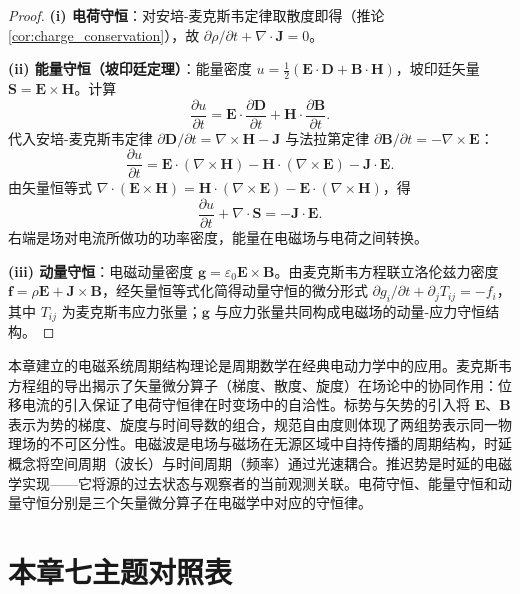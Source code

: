 \begin{proof}
\textbf{(i) 电荷守恒}：对安培-麦克斯韦定律取散度即得（推论 \ref{cor:charge_conservation}），故 $\partial\rho/\partial t + \nabla\cdot\mathbf{J}=0$。

\textbf{(ii) 能量守恒（坡印廷定理）}：能量密度 $u = \frac12(\mathbf{E}\cdot\mathbf{D} + \mathbf{B}\cdot\mathbf{H})$，坡印廷矢量 $\mathbf{S} = \mathbf{E}\times\mathbf{H}$。计算
\[
\frac{\partial u}{\partial t} = \mathbf{E}\cdot\frac{\partial\mathbf{D}}{\partial t} + \mathbf{H}\cdot\frac{\partial\mathbf{B}}{\partial t}.
\]
代入安培-麦克斯韦定律 $\partial\mathbf{D}/\partial t = \nabla\times\mathbf{H} - \mathbf{J}$ 与法拉第定律 $\partial\mathbf{B}/\partial t = -\nabla\times\mathbf{E}$：
\[
\frac{\partial u}{\partial t} = \mathbf{E}\cdot(\nabla\times\mathbf{H}) - \mathbf{H}\cdot(\nabla\times\mathbf{E}) - \mathbf{J}\cdot\mathbf{E}.
\]
由矢量恒等式 $\nabla\cdot(\mathbf{E}\times\mathbf{H}) = \mathbf{H}\cdot(\nabla\times\mathbf{E}) - \mathbf{E}\cdot(\nabla\times\mathbf{H})$，得
\[
\frac{\partial u}{\partial t} + \nabla\cdot\mathbf{S} = -\mathbf{J}\cdot\mathbf{E}.
\]
右端是场对电流所做功的功率密度，能量在电磁场与电荷之间转换。

\textbf{(iii) 动量守恒}：电磁动量密度 $\mathbf{g} = \varepsilon_0\mathbf{E}\times\mathbf{B}$。由麦克斯韦方程联立洛伦兹力密度 $\mathbf{f} = \rho\mathbf{E} + \mathbf{J}\times\mathbf{B}$，经矢量恒等式化简得动量守恒的微分形式 $\partial g_i/\partial t + \partial_j T_{ij} = -f_i$，其中 $T_{ij}$ 为麦克斯韦应力张量；$\mathbf{g}$ 与应力张量共同构成电磁场的动量-应力守恒结构。
\end{proof}

\begin{remark}[与全书的统一]
本章建立的电磁系统周期结构理论是周期数学在经典电动力学中的应用。麦克斯韦方程组的导出揭示了矢量微分算子（梯度、散度、旋度）在场论中的协同作用：位移电流的引入保证了电荷守恒律在时变场中的自洽性。标势与矢势的引入将 $\mathbf{E}$、$\mathbf{B}$ 表示为势的梯度、旋度与时间导数的组合，规范自由度则体现了两组势表示同一物理场的不可区分性。电磁波是电场与磁场在无源区域中自持传播的周期结构，时延概念将空间周期（波长）与时间周期（频率）通过光速耦合。推迟势是时延的电磁学实现——它将源的过去状态与观察者的当前观测关联。电荷守恒、能量守恒和动量守恒分别是三个矢量微分算子在电磁学中对应的守恒律。
\end{remark}

\section*{本章七主题对照表}

